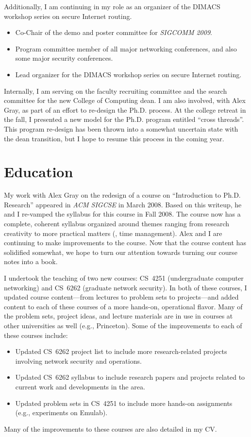 \begin{sloppypar}
Additionally, I am continuing in my role as an organizer of the DIMACS
workshop series on secure Internet routing.

\begin{itemize}
\itemsep=-1pt
\item Co-Chair of the demo and poster committee for {\em SIGCOMM 2009}. 
\item Program committee member of all major networking conferences, and
  also some major security conferences.
\item Lead organizer for the DIMACS workshop series on secure Internet
routing. 
\end{itemize}

Internally, I am serving on the faculty recruiting committee and the
search committee for the new College of Computing dean.  I am also
involved, with Alex Gray, as part of an effort to re-design the
Ph.D. process.  At the college retreat in the fall, I presented a new
model for the Ph.D. program entitled ``cross threads''.  This program
re-design has been thrown into a somewhat uncertain state with the dean
transition, but I hope to resume this process in the coming year.

\section*{Education}


My work with Alex Gray on the redesign of a course on ``Introduction to
Ph.D. Research'' appeared in {\em ACM SIGCSE} in March 2008.  Based on
this writeup, he and I re-vamped the syllabus for this course in Fall
2008. The course now has a complete, coherent syllabus organized around
themes ranging from research creativity to more practical matters (\eg,
time management).  Alex and I are continuing to make improvements to the
course.  Now that the course content has solidified somewhat, we hope to
turn our attention towards turning our course notes into a book.

I undertook the teaching of two new courses: CS~4251 (undergraduate
computer networking) and CS~6262 (graduate network security).  In both
of these courses, I updated course content---from lectures to problem
sets to projects---and added content to each of these courses of a more
hands-on, operational flavor.  Many of the problem sets, project ideas,
and lecture materials are in use in courses at other universities as
well (e.g., Princeton). Some of the improvements to each of these
courses include:
\begin{itemize}
\itemsep=-1pt
\item Updated CS~6262 project list to include more research-related
projects involving network security and operations.
\item Updated CS~6262 syllabus to include research papers and projects
related to current work and developments in the area.
\item Updated problem sets in CS~4251 to include more hands-on
assignments (e.g., experiments on Emulab).
\end{itemize}
\noindent
Many of the improvements to these courses are also detailed in my CV.  



\end{sloppypar}
